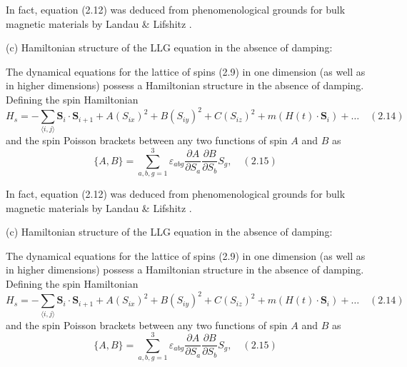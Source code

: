\documentclass{article}
\begin{document}
In fact, equation (2.12) was deduced from phenomenological grounds for bulk magnetic materials by Landau \& Lifshitz \cite{landau}.

(c) Hamiltonian structure of the LLG equation in the absence of damping:

The dynamical equations for the lattice of spins (2.9) in one dimension (as well as in higher dimensions) possess a Hamiltonian structure in the absence of damping. Defining the spin Hamiltonian
\begin{equation}
H_s = - \sum_{\langle i,j \rangle} \mathbf{S}_i \cdot \mathbf{S}_{i+1} + A(S_{ix})^2 + B(S_{iy})^2 + C (S_{iz})^2 + m(H(t) \cdot \mathbf{S}_i) + \ldots \quad (2.14)
\end{equation}
and the spin Poisson brackets between any two functions of spin $A$ and $B$ as
\begin{equation}
\{A, B\} = \sum_{a,b,g=1}^3 \varepsilon_{abg} \frac{\partial A}{\partial S_a} \frac{\partial B}{\partial S_b} S_g, \quad (2.15)
\end{equation}

	
	In fact, equation (2.12) was deduced from phenomenological grounds for bulk magnetic materials by Landau \& Lifshitz \cite{landau}.
	
	(c) Hamiltonian structure of the LLG equation in the absence of damping:
	
	The dynamical equations for the lattice of spins (2.9) in one dimension (as well as in higher dimensions) possess a Hamiltonian structure in the absence of damping. Defining the spin Hamiltonian
	\begin{equation}
	H_s = - \sum_{\langle i,j \rangle} \mathbf{S}_i \cdot \mathbf{S}_{i+1} + A(S_{ix})^2 + B(S_{iy})^2 + C (S_{iz})^2 + m(H(t) \cdot \mathbf{S}_i) + \ldots \quad (2.14)
	\end{equation}
	and the spin Poisson brackets between any two functions of spin $A$ and $B$ as
	\begin{equation}
	\{A, B\} = \sum_{a,b,g=1}^3 \varepsilon_{abg} \frac{\partial A}{\partial S_a} \frac{\partial B}{\partial S_b} S_g, \quad (2.15)
	\end{equation}
\end{document}
